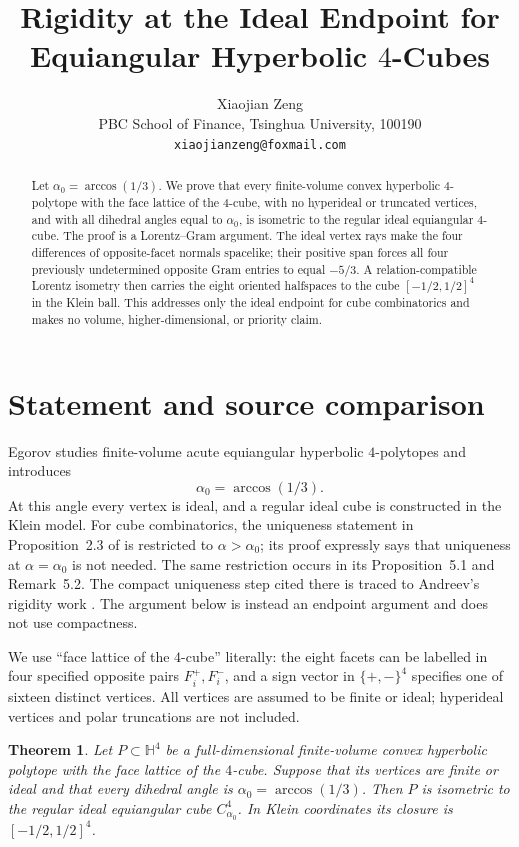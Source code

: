\documentclass[11pt]{article}
\title{Rigidity at the Ideal Endpoint for Equiangular Hyperbolic $4$-Cubes}
\author{Xiaojian Zeng\\
PBC School of Finance, Tsinghua University, 100190\\
\texttt{xiaojianzeng@foxmail.com}}
\date{}
\newtheorem{theorem}{Theorem}
\begin{document}
\maketitle

\begin{abstract}
Let $\alpha _0=\arccos(1/3)$.  We prove that every finite-volume
convex hyperbolic $4$-polytope with the face lattice of the $4$-cube,
with no hyperideal or truncated vertices, and with all dihedral angles
equal to $\alpha _0$, is isometric to the regular ideal equiangular
$4$-cube.  The proof is a Lorentz--Gram argument.  The ideal vertex
rays make the four differences of opposite-facet normals spacelike;
their positive span forces all four previously undetermined opposite
Gram entries to equal $-5/3$.  A relation-compatible Lorentz isometry
then carries the eight oriented halfspaces to the cube
$[-1/2,1/2]^4$ in the Klein ball.  This addresses only the ideal
endpoint for cube combinatorics and makes no volume, higher-dimensional,
or priority claim.
\end{abstract}

\section{Statement and source comparison}

Egorov studies finite-volume acute equiangular hyperbolic
$4$-polytopes and introduces
\[
  \alpha _0=\arccos(1/3).
\]
At this angle every vertex is ideal, and a regular ideal cube is
constructed in the Klein model.  For cube combinatorics, the uniqueness
statement in Proposition~2.3 of \cite{Egorov2026} is restricted to
$\alpha>\alpha _0$; its proof expressly says that uniqueness at
$\alpha=\alpha _0$ is not needed.  The same restriction occurs in its
Proposition~5.1 and Remark~5.2.  The compact uniqueness step cited there
is traced to Andreev's rigidity work \cite{Andreev1970}.  The argument
below is instead an endpoint argument and does not use compactness.

We use ``face lattice of the $4$-cube'' literally: the eight facets can
be labelled in four specified opposite pairs $F_i^+,F_i^-$, and a sign
vector in $\{+,-\}^4$ specifies one of sixteen distinct vertices.  All
vertices are assumed to be finite or ideal; hyperideal vertices and
polar truncations are not included.

\begin{theorem}\label{thm:main}
Let $P\subset\mathbb H^4$ be a full-dimensional finite-volume convex
hyperbolic polytope with the face lattice of the $4$-cube.  Suppose
that its vertices are finite or ideal and that every dihedral angle is
$\alpha _0=\arccos(1/3)$.  Then $P$ is isometric to the regular ideal
equiangular cube $C^4_{\alpha _0}$.  In Klein coordinates its closure
is $[-1/2,1/2]^4$.
\end{theorem}
\end{document}
